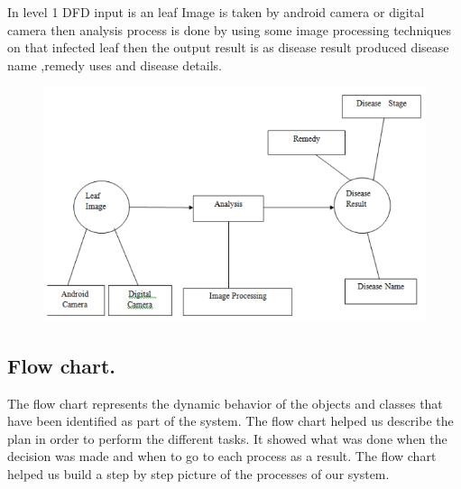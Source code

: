 \documentclass[11pt]{report}
\begin{document}
\newpage
In level 1 DFD input is an leaf Image is taken by android
camera or digital camera then analysis process is done by
using some image processing techniques on that infected leaf
then the output result is as disease result produced disease
name ,remedy uses and disease details.\\

\begin{figure}[h]
	\centerline{\small 
		\includegraphics[height=0.3\textheight]  {f}}
\end{figure}

\newpage
\subsection{Flow chart.}
The flow chart represents the dynamic behavior of the objects and classes that have been identified as part of the system.
The flow chart helped us describe the plan in order to perform the different tasks. It showed what was done when the decision was made and when to go to each process as a result. The flow chart helped us build a step by step picture of the processes of our system.\\
\end{document}

